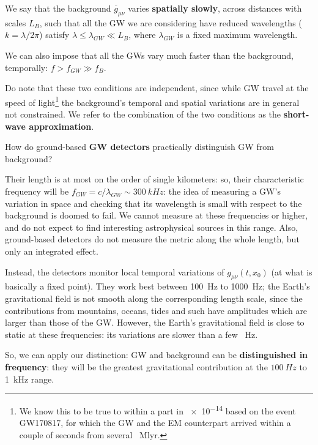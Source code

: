 \documentclass[main.tex]{subfiles}
\begin{document}
We say that the background \(\overline{g}_{\mu \nu }\) varies \textbf{spatially slowly}, across distances with scales \(L_B\), such that all the GW we are considering have reduced wavelengths (\(k = \lambda /2 \pi \)) satisfy \(\lambda  \leq \lambda_{GW} \ll L_B\), where \(\lambda_{GW}\) is a fixed maximum wavelength. 

We can also impose that all the GWs vary much faster than the background, temporally: \(f > f_{GW} \gg f_B\). 

Do note that these two conditions are independent, since while GW travel at the speed of light\footnote{We know this to be true to within a part in \num{e-14} based on the event GW170817, for which the GW and the EM counterpart arrived within a couple of seconds from several \SI{}{Mlyr}.} the background's temporal and spatial variations are in general not constrained. 
We refer to the combination of the two conditions as the \textbf{short-wave approximation}. 

How do ground-based \textbf{GW detectors} practically distinguish GW from background? 

Their length is at most on the order of single kilometers: so, their characteristic frequency will be \(f_{GW} = c / \lambda_{GW}  \sim \SI{300}{kHz}\): the idea of measuring a GW's variation in space and checking that its wavelength is small with respect to the background is doomed to fail.
We cannot measure at these frequencies or higher, and do not expect to find interesting astrophysical sources in this range.
Also, ground-based detectors do not measure the metric along the whole length, but only an integrated effect. 

Instead, the detectors monitor local temporal variations of \(g_{\mu \nu } (t, x_0 )\) (at what is basically a fixed point). 
They work best between \SI{100}{Hz} to \SI{1000}{Hz}; the Earth's gravitational field is not smooth along the corresponding length scale, since the contributions from mountains, oceans, tides and such have amplitudes which are larger than those of the GW.
However, the Earth's gravitational field is close to static at these frequencies: its variations are slower than a few \SI{}{Hz}.

So, we can apply our distinction: GW and background can be \textbf{distinguished in frequency}: they will be the greatest gravitational contribution at the \(\SI{100}{Hz}\) to \SI{1}{kHz} range. 
\end{document}
